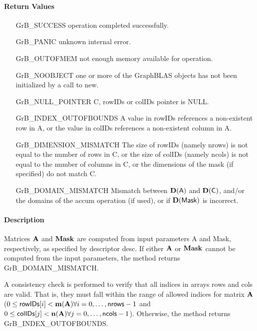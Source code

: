 \paragraph{Return Values}

\begin{itemize}[leftmargin=2.1in]
\item[{\sf GrB\_SUCCESS}]     operation completed successfully.
\item[{\sf GrB\_PANIC}]        unknown internal error.
\item[{\sf GrB\_OUTOFMEM}]    not enough memory available for operation.
\item[{\sf GrB\_NOOBJECT}]   one or more of the GraphBLAS objects has
                             not been initialized by a call to {\sf new}.
\item[{\sf GrB\_NULL\_POINTER}]    {\sf C}, {\sf rowIDs} or {\sf colIDs} pointer is {\sf NULL}.

\item[{\sf GrB\_INDEX\_OUTOFBOUNDS}]
        A value in {\sf rowIDs} references a non-existent row in {\sf A}, or
        the value in {\sf colIDs} references a non-existent column in {\sf A}.
\item[{\sf GrB\_DIMENSION\_MISMATCH}] 
        The size of {\sf rowIDs} (namely {\sf nrows}) is not equal to the number of rows in {\sf C}, or
        the size of {\sf colIDs} (namely {\sf ncols}) is not equal to the number of columns in {\sf C}, or
        the dimensions of the mask (if specified) do not match {\sf C}.
\item[{\sf GrB\_DOMAIN\_MISMATCH}]    Mismatch between $\bold{D}({\sf A})$ and $\bold{D}({\sf C})$, 
                                      and/or the domains of the 
                                      {\sf accum} operation (if used), or if $\bold{D}(\sf Mask)$ is incorrect.
\end{itemize}


\paragraph{Description}

Matrices ${\bf A}$ and ${\bf Mask}$ are computed from input
parameters {\sf A} and {\sf Mask}, respectively, as specified by
descriptor {\sf desc}.  If either ${\bf A}$ or ${\bf Mask}$
cannot be computed from the input parameters, the method returns {\sf
GrB\_DOMAIN\_MISMATCH}.

A consistency check is performed to verify that all indices in arrays
{\sf rows} and {\sf cols} are valid. That is, they must fall within the range of allowed
indices for matrix ${\bf A}$ ($0 \leq {\sf rowIDs}[i] < \bold{m}({\bf A})
\forall i = 0,\ldots,{\sf nrows}-1$ and
$0 \leq {\sf colIDs}[j] < \bold{n}({\bf A}) \forall j = 0,\ldots,{\sf ncols}-1$).  Otherwise, the method returns {\sf
GrB\_INDEX\_OUTOFBOUNDS}.

